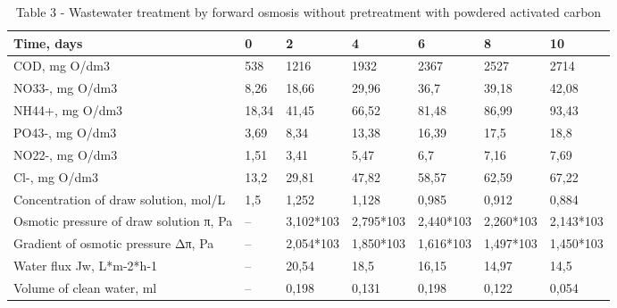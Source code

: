 \begin{table}[H]
\caption*{Table 3 - Wastewater treatment by forward osmosis without pretreatment with powdered activated carbon}
\centering
\begin{tabular}{|p{}|l|l|l|l|l|l|}
\hline
Time, days                & 0     & 2     & 4     & 6     & 8     & 10    \\ \hline
COD, mg O/dm3             & 538   & 1216  & 1932  & 2367  & 2527  & 2714  \\ \hline
NO33-, mg O/dm3           & 8,26  & 18,66 & 29,96 & 36,7  & 39,18 & 42,08 \\ \hline
NH44+, mg O/dm3           & 18,34 & 41,45 & 66,52 & 81,48 & 86,99 & 93,43 \\ \hline
PO43-, mg O/dm3           & 3,69  & 8,34  & 13,38 & 16,39 & 17,5  & 18,8  \\ \hline
NO22-, mg O/dm3           & 1,51  & 3,41  & 5,47  & 6,7   & 7,16  & 7,69  \\ \hline
Cl-, mg O/dm3             & 13,2  & 29,81 & 47,82 & 58,57 & 62,59 & 67,22 \\ \hline
Concentration of draw solution, mol/L   & 1,5 & 1,252     & 1,128     & 0,985     & 0,912     & 0,884     \\ \hline
Osmotic pressure of draw solution π, Pa & –   & 3,102*103 & 2,795*103 & 2,440*103 & 2,260*103 & 2,143*103 \\ \hline
Gradient of osmotic pressure Δπ, Pa     & –   & 2,054*103 & 1,850*103 & 1,616*103 & 1,497*103 & 1,450*103 \\ \hline
Water flux Jw, L*m-2*h-1  & –     & 20,54 & 18,5  & 16,15 & 14,97 & 14,5  \\ \hline
Volume of clean water, ml & –     & 0,198 & 0,131 & 0,198 & 0,122 & 0,054 \\ \hline
\end{tabular}
\end{table}

